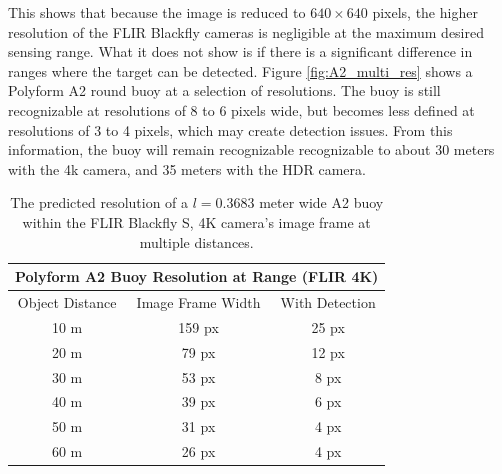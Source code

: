 \documentclass{erauthesis}
\begin{document}

This shows that because the image is reduced to $640 \times 640$ pixels, the higher resolution of the FLIR Blackfly cameras is negligible at the maximum desired sensing range. What it does not show is if there is a significant difference in ranges where the target can be detected. 
Figure \ref{fig:A2_multi_res} shows a Polyform A2 round buoy at a selection of resolutions. 
The buoy is still recognizable at resolutions of 8 to 6 pixels wide, but becomes less defined at resolutions of 3 to 4 pixels, which may create detection issues. %
From this information, the buoy will remain recognizable recognizable to about 30 meters with the 4k camera, and 35 meters with the HDR camera.

\begin{table}[p]
\centering
\begin{tabular}{c|c|c}
\hline
\multicolumn{3}{c}{Polyform A2 Buoy Resolution at Range (FLIR 4K)}\\
\hline
\hline
Object Distance & Image Frame Width & With Detection \\
\hline
10 m & 159 px & 25 px \\
20 m & 79 px & 12 px \\
30 m & 53 px & 8 px \\
40 m & 39 px & 6 px \\
50 m & 31 px & 4 px \\
60 m & 26 px & 4 px \\
\hline
\end{tabular}
\caption{The predicted resolution of a $\mathit{l} = 0.3683$ meter wide A2 buoy within the FLIR Blackfly S, 4K camera's image frame at multiple distances.}
\label{table:buoy_res_4k}
\end{table}
\end{document}
